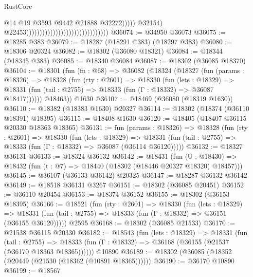 \begin{lexlean}{RustCore}
\begin{coremodule}
                                                                              @14
                                                                              @19
                                                                              @3593
                                                                              @9442
                                                                              @21888
                                                                              @32272)))))
                                                                    @32154)
                                                                  @22453)))))))))))))))))))))))))))))))
@36074 := @34950 @36073
@36075 := @18285 @383
@36079 := @18287 (@18291 @383) (@18297 @383)
@36080 := @18306 @20324
@36082 := @18302 (@36080 @18321)
@36084 := @18344 (@18345 @383)
@36085 := @18340 @36084
@36087 := @18302 (@36085 @18370)
@36104 := @18301
    (fun (fn : @68) =>
    @36082
      (@18324
        (@18327
          (fun (params : @18326) =>
          @18328
            (fun (rty : @2601) =>
            @18330
              (fun (lets : @18329) =>
              @18331 (fun (tail : @2755) => @18333 (fun (Γ : @18332) => @36087 @18417))))))
        @18463))
    @1630
@36107 := @18469 (@36080 (@18319 @1630))
@36110 := @18382 (@18383 @1630) @20327
@36114 := @18302 (@18374 (@36110 @18391) @18395)
@36115 := @18408 @1630
@36120 := @18405 (@18407 @36115 @20330 @18363 @18365)
@36131 := fun (params : @18326) =>
  @18328
    (fun (rty : @2601) =>
    @18330
      (fun (lets : @18329) =>
      @18331 (fun (tail : @2755) => @18333 (fun (Γ : @18332) => @36087 (@36114 @36120)))))
@36132 := @18327 @36131
@36133 := @18324 @36132
@36142 := @18431
    (fun (U : @18430) => @18432 (fun (t : @7) => @18440 (@18302 (@18446 @20327 @18320) @18457)))
@36145 := @36107 (@36133 @36142) @20325
@36147 := @18287 @36132 @36142
@36149 := @18518 @36131 @3267
@36151 := @18302 (@36085 @20451)
@36152 := @36110 @20454
@36153 := @18374 @36152
@36155 := @18302 (@36153 @18395)
@36166 := @18521
    (fun (rty : @2601) =>
    @18330
      (fun (lets : @18329) =>
      @18331 (fun (tail : @2755) => @18333 (fun (Γ : @18332) => @36151 (@36155 @36120)))))
    @2595
@36168 := @18302 (@36085 @21533)
@36170 := @21538 @36115 @20330
@36182 := @18543
    (fun (lets : @18329) =>
    @18331
      (fun (tail : @2755) =>
      @18333 (fun (Γ : @18332) => @36168 (@36155 (@21537 (@36170 @18363 @18365))))))
    @10890
@36189 := @18302 (@36085 (@18352 (@20449 (@21530 (@18362 (@10891 @18365))))))
@36190 := @36170 @10890
@36199 := @18567

\end{coremodule}
\end{lexlean}
